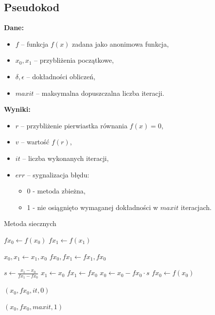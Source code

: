 \documentclass{article}
\begin{document}
\subsection{Pseudokod}
\textbf{Dane:}
\begin{itemize}
  \item \( f \) – funkcja \( f(x) \) zadana jako anonimowa funkcja,
  \item \( x_0, x_1 \) – przybliżenia początkowe,
  \item \( \delta, \epsilon \) – dokładności obliczeń,
  \item \( maxit \) – maksymalna dopuszczalna liczba iteracji.
\end{itemize}

\noindent \textbf{Wyniki:}
\begin{itemize}
  \item \( r \) – przybliżenie pierwiastka równania \( f(x) = 0 \),
  \item \( v \) – wartość \( f(r) \),
  \item \( it \) – liczba wykonanych iteracji,
  \item \( err \) – sygnalizacja błędu:
  \begin{itemize}
    \item 0 - metoda zbieżna,
    \item 1 - nie osiągnięto wymaganej dokładności w \( maxit \) iteracjach.
  \end{itemize}
\end{itemize}

\begin{algorithm}[H]
\caption{Metoda siecznych}
\begin{algorithmic}[1]

\STATE $fx_0 \gets f(x_0)$
\STATE $fx_1 \gets f(x_1)$

        \STATE $x_0, x_1 \gets x_1, x_0$
        \STATE $fx_0, fx_1 \gets fx_1, fx_0$
    \ENDIF
    
    \STATE $s \gets \frac{x_1 - x_0}{fx_1 - fx_0}$
    \STATE $x_1 \gets x_0$
    \STATE $fx_1 \gets fx_0$
    \STATE $x_0 \gets x_0 - fx_0 \cdot s$
    \STATE $fx_0 \gets f(x_0)$
    
        \RETURN $(x_0, fx_0, it, 0)$
    \ENDIF
\ENDFOR

\RETURN $(x_0, fx_0, maxit, 1)$
\end{algorithmic}
\end{algorithm}
\end{document}
